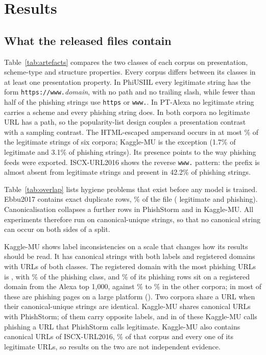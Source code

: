 \section{Results}
\label{sec:results}

\subsection{What the released files contain}
\label{sec:files}
Table~\ref{tab:artefacts} compares the two classes of each corpus on presentation, scheme-type and structure properties. Every corpus differs between its classes in at least one presentation property. In PhiUSIIL every legitimate string has the form \texttt{https://www.}\emph{domain}, with no path and no trailing slash, while fewer than half of the phishing strings use \texttt{https} or \texttt{www.}. In PT-Alexa no legitimate string carries a scheme and every phishing string does. In both corpora no legitimate URL has a path, so the popularity-list design couples a presentation contrast with a sampling contrast. The HTML-escaped ampersand occurs in at most \AmpLegitMaxOther\% of the legitimate strings of six corpora; Kaggle-MU is the exception (1.7\% of legitimate and 3.1\% of phishing strings). Its presence points to the way phishing feeds were exported. ISCX-URL2016 shows the reverse \texttt{www.} pattern: the prefix is almost absent from legitimate strings and present in 42.2\% of phishing strings.

Table~\ref{tab:overlap} lists hygiene problems that exist before any model is trained. Ebbu2017 contains \DupEbbu{} exact duplicate rows, \DupPctEbbu\% of the file (\DupLegitEbbu{} legitimate and \DupPhishEbbu{} phishing). Canonicalisation collapses a further \CanonDupPhishStorm{} rows in PhishStorm and \CanonDupKaggleMU{} in Kaggle-MU. All experiments therefore run on canonical-unique strings, so that no canonical string can occur on both sides of a split.

Kaggle-MU shows label inconsistencies on a scale that changes how its results should be read. It has \CanonConfKaggleMU{} canonical strings with both labels and \MixedKaggleMU{} registered domains with URLs of both classes. The registered domain with the most phishing URLs is \texttt{\LargestPhishKaggleMU}, with \LargestPhishPctKaggleMU\% of the phishing class, and \TopKKaggleMU\% of its phishing rows sit on a registered domain from the Alexa top 1,000, against \TopKMinOther\% to \TopKMaxOther\% in the other corpora; in \TopKMaxOtherCorpus{} most of these are phishing pages on a large platform (\texttt{\LargestPhishPTAlexa}). Two corpora share a URL when their canonical-unique strings are identical. Kaggle-MU shares \XSharedKaggleMUPhishStorm{} canonical URLs with PhishStorm; \XConfKaggleMUPhishStorm{} of them carry opposite labels, and in \XConfAPKaggleMUPhishStorm{} of these Kaggle-MU calls phishing a URL that PhishStorm calls legitimate. Kaggle-MU also contains \XSharedISCXURLKaggleMU{} canonical URLs of ISCX-URL2016, \ISCXInKagglePct\% of that corpus and every one of its legitimate URLs, so results on the two are not independent evidence.

